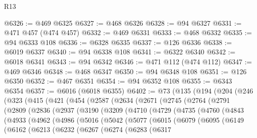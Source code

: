 \begin{lexlean}{R13}
\begin{coremodule}
@6326 := @469 @6325
@6327 := @468 @6326
@6328 := @94 @6327
@6331 := @471 @457 (@474 @457)
@6332 := @469 @6331
@6333 := @468 @6332
@6335 := @94 @6333 @108
@6336 := @6328 @6335
@6337 := @126 @6336
@6338 := @6019 @6337
@6340 := @94 @6338 @108
@6341 := @6322 @6340
@6342 := @6018 @6341
@6343 := @94 @6342
@6346 := @471 @112 (@474 @112)
@6347 := @469 @6346
@6348 := @468 @6347
@6350 := @94 @6348 @108
@6351 := @126 @6350
@6352 := @467 @6351
@6354 := @94 @6352 @108
@6355 := @6343 @6354
@6357 := @6016 (@6018 @6355)
@6402 := @73
    (@135
      (@194
        (@204
          (@246
            (@323
              (@415
                (@421
                  (@454
                    (@2587
                      (@2634
                        (@2671
                          (@2745
                            (@2764
                              (@2791
                                (@2809
                                  (@2836
                                    (@2937
                                      (@3190
                                        (@3209
                                          (@4710
                                            (@4729
                                              (@4735
                                                (@4760
                                                  (@4843
                                                    (@4933
                                                      (@4962
                                                        (@4986
                                                          (@5016
                                                            (@5042
                                                              (@5077
                                                                (@6015
                                                                  (@6079
                                                                    (@6095
                                                                      (@6149
                                                                        (@6162
                                                                          (@6213
                                                                            (@6232
                                                                              (@6267
                                                                                (@6274
                                                                                  (@6283
                                                                                    (@6317

\end{coremodule}
\end{lexlean}
